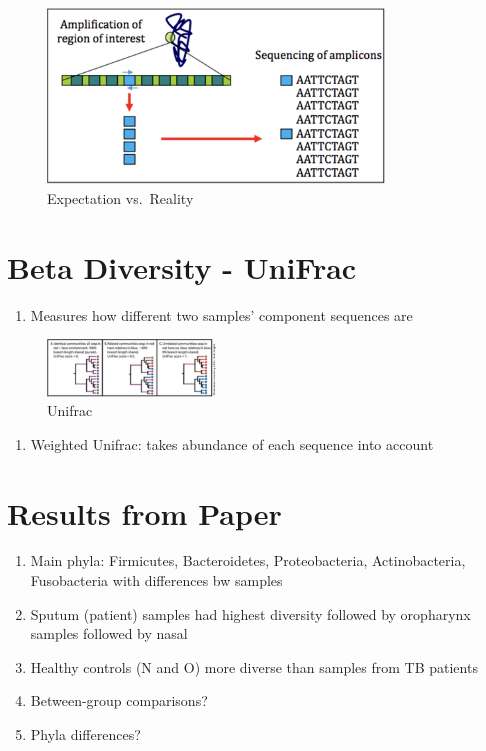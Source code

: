 \documentclass[
]{book}
\providecommand{\tightlist}{%
  \setlength{\itemsep}{0pt}\setlength{\parskip}{0pt}}
\begin{document}
\begin{figure}
\centering
\includegraphics[width=0.8\textwidth,height=\textheight]{./Figures/16sbenefits.png}
\caption{Expectation vs.~Reality}
\end{figure}

\hypertarget{beta-diversity---unifrac}{%
\section{Beta Diversity - UniFrac}\label{beta-diversity---unifrac}}

\begin{enumerate}
\def\labelenumi{\arabic{enumi}.}
\tightlist
\item
  Measures how different two samples' component sequences are
\end{enumerate}

\begin{figure}
\centering
\includegraphics[width=0.4\textwidth,height=\textheight]{./Figures/UniFrac.png}
\caption{Unifrac}
\end{figure}

\begin{enumerate}
\def\labelenumi{\arabic{enumi}.}
\setcounter{enumi}{1}
\tightlist
\item
  Weighted Unifrac: takes abundance of each sequence into account
\end{enumerate}

\hypertarget{results-from-paper}{%
\section{Results from Paper}\label{results-from-paper}}

\begin{enumerate}
\def\labelenumi{\arabic{enumi}.}
\tightlist
\item
  Main phyla: Firmicutes, Bacteroidetes, Proteobacteria, Actinobacteria, Fusobacteria with differences bw samples
\item
  Sputum (patient) samples had highest diversity followed by oropharynx samples followed by nasal
\item
  Healthy controls (N and O) more diverse than samples from TB patients
\item
  Between-group comparisons?
\item
  Phyla differences?
\end{enumerate}
\end{document}
